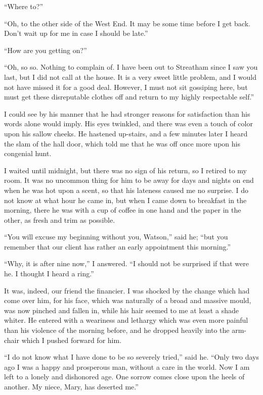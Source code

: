 “Where to?”

“Oh, to the other side of the West End. It may be some
time before I get back. Don’t wait up for me in case I should
be late.”

“How are you getting on?”

“Oh, so so. Nothing to complain of. I have been out to
Streatham since I saw you last, but I did not call at the house.
It is a very sweet little problem, and I would not have missed
it for a good deal. However, I must not sit gossiping here,
but must get these disreputable clothes off and return to my
highly respectable self.”

I could see by his manner that he had stronger reasons for
satisfaction than his words alone would imply. His eyes
twinkled, and there was even a touch of color upon his sallow
cheeks. He hastened up-stairs, and a few minutes later I
heard the slam of the hall door, which told me that he was off
once more upon his congenial hunt.

I waited until midnight, but there was no sign of his return,
so I retired to my room. It was no uncommon thing for him
to be away for days and nights on end when he was hot upon
a scent, so that his lateness caused me no surprise. I do not
know at what hour he came in, but when I came down to
breakfast in the morning, there he was with a cup of coffee
in one hand and the paper in the other, as fresh and trim as
possible.

“You will excuse my beginning without you, Watson,” said
he; “but you remember that our client has rather an early
appointment this morning.”

“Why, it is after nine now,” I answered. “I should not be
surprised if that were he. I thought I heard a ring.”

It was, indeed, our friend the financier. I was shocked by
the change which had come over him, for his face, which was
naturally of a broad and massive mould, was now pinched and
fallen in, while his hair seemed to me at least a shade whiter.
He entered with a weariness and lethargy which was even
more painful than his violence of the morning before, and he
dropped heavily into the arm-chair which I pushed forward
for him.

“I do not know what I have done to be so severely tried,”
said he. “Only two days ago I was a happy and prosperous
man, without a care in the world. Now I am left to a lonely
and dishonored age. One sorrow comes close upon the heels
of another. My niece, Mary, has deserted me.”

